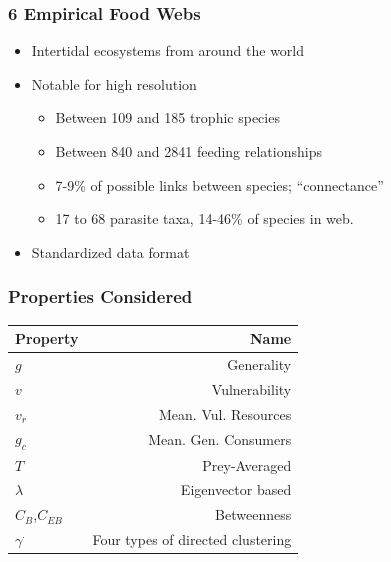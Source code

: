\documentclass[table]{beamer}
\begin{document}
\begin{frame}
    \frametitle{6 Empirical Food Webs}
    \begin{itemize}[<+->]
        \item Intertidal ecosystems from around the world
        \item Notable for high resolution
            \begin{itemize}
                \item Between 109 and 185 trophic species 
                \item Between 840 and 2841 feeding relationships
                \item 7-9\% of possible links between species;
                    ``connectance''
                \item 17 to 68 parasite taxa, 14-46\% of species in web.
            \end{itemize}
        \item Standardized data format
    \end{itemize}
\end{frame}


\begin{frame} 
    \frametitle{Properties Considered}
    \centering
    \begin{tabular}{l r}
        \toprule
            Property&Name\\
            \midrule
            $g$&Generality\\
            $v$&Vulnerability\\
            $v_r$&Mean. Vul. Resources\\
            $g_c$&Mean. Gen. Consumers\\
            $T$&Prey-Averaged\\
            $\lambda$&Eigenvector based\\
            $C_B$,$C_{EB}$&Betweenness\\
            $\gamma^{\cdot}$&Four types of directed clustering\\
            \bottomrule
    \end{tabular}
\end{frame}

\end{document}
